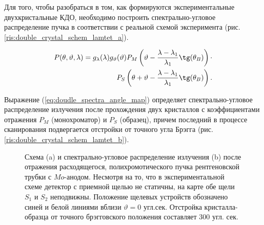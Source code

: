 
Для того, чтобы разобраться в том, как формируются экспериментальные
двухкристальные КДО, необходимо построить спектрально-угловое распределение пучка
в соответствии с реальной схемой эксперимента (рис. \ref{ris:double_crystal_schem_lamtet_a}).

\begin{eqnarray} \label{eq:doudle_spectra_angle_map}
  P(\theta,\vartheta,\lambda) = g_{\lambda}(\lambda)g_{\vartheta}(\vartheta) P_M \left(\vartheta - \frac{\lambda - \lambda_1}{\lambda_1}\tg(\theta_B) \right) \cdot \nonumber \\
   P_S \left(\theta + \vartheta - \frac{\lambda - \lambda_1}{\lambda_1}\tg(\theta_B)\right).
 \end{eqnarray}

Выражение (\ref{eq:doudle_spectra_angle_map}) определяет спектрально-угловое распределение излучения после прохождения двух кристаллов с
коэффициентами отражения  $P_M$ (монохроматор) и $P_S$ (образец), причем последний в процессе сканирования подвергается отстройки от точного угла Брэгга
 (рис. \ref{ris:double_crystal_schem_lamtet_b}).

\begin{figure}[H]
  \centering
  \hfill

  \caption{Схема (a) и спектрально-угловое распределение излучения (b) после
  отражения расходящегося, полихромотического пучка рентгеновской трубки с $Mo$-анодом.
  Несмотря на то, что в экспериментальной схеме детектор с приемной
   щелью не статичны, на карте обе щели $S_1$ и $S_2$ неподвижны.
  Положение щелевых устройств обозначено синей и белой линиями
  вблизи $\vartheta = 0$ угл.сек. Отстройка кристалла-образца от
  точного брэгговского положения составляет 300 угл. сек. }
  \label{ris:double_crystal_schem_lamtet}
\end{figure}

